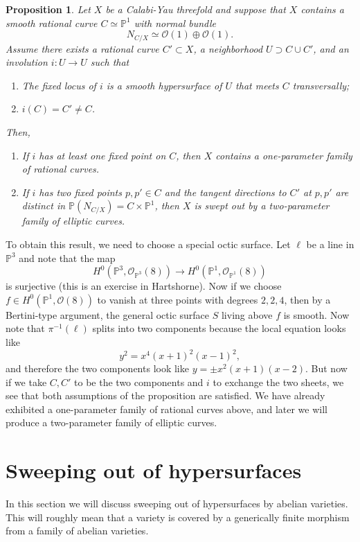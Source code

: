 \documentclass[leqno, openany]{memoir}
\newtheorem{prop}[thm]{Proposition}
\theoremstyle{definition}
\theoremstyle{remark}
\theoremstyle{plain}
\theoremstyle{definition}
\theoremstyle{remark}
\renewcommand{\P}{\mathbb{P}}
\newcommand{\mc}[1]{\mathcal{#1}}
\begin{document}
\begin{prop}
    Let $X$ be a Calabi-Yau threefold and suppose that $X$ contains a smooth rational curve $C \simeq \P^1$ with normal bundle 
    \[ N_{C/X} \simeq \mc{O}(1) \oplus \mc{O}(1). \]
    Assume there exists a rational curve $C' \subset X$, a neighborhood $U \supset C \cup C'$, and an involution $i \colon U \to U$ such that
    \begin{enumerate}[(1)]
        \item The fixed locus of $i$ is a smooth hypersurface of $U$ that meets $C$ transversally;
        \item $i(C) = C' \neq C$.
    \end{enumerate}
    Then,
    \begin{enumerate}[(1)]
        \item If $i$ has at least one fixed point on $C$, then $X$ contains a one-parameter family of rational curves.
        \item If $i$ has two fixed points $p, p' \in C$ and the tangent directions to $C'$ at $p, p'$ are distinct in $\P(N_{C/X}) = C \times \P^1$, then $X$ is swept out by a two-parameter family of elliptic curves.
    \end{enumerate}
\end{prop}

To obtain this result, we need to choose a special octic surface. Let $\ell$ be a line in $\P^3$ and note that the map
\[ H^0(\P^3, \mc{O}_{\P^3}(8)) \to H^0(\P^1, \mc{O}_{\P^1}(8)) \]
is surjective (this is an exercise in Hartshorne). Now if we choose $f \in H^0(\P^1, \mc{O}(8))$ to vanish at three points with degrees $2,2,4$, then by a Bertini-type argument, the general octic surface $S$ living above $f$ is smooth. Now note that $\pi^{-1}(\ell)$ splits into two components because the local equation looks like
\[ y^2 = x^4 (x+1)^2 (x-1)^2, \]
and therefore the two components look like $y = \pm x^2 (x+1)(x-2)$. But now if we take $C, C'$ to be the two components and $i$ to exchange the two sheets, we see that both assumptions of the proposition are satisfied. We have already exhibited a one-parameter family of rational curves above, and later we will produce a two-parameter family  of elliptic curves.

\section{Sweeping out of hypersurfaces}

In this section we will discuss sweeping out of hypersurfaces by abelian varieties. This will roughly mean that a variety is covered by a generically finite morphism from a family of abelian varieties.
\end{document}
